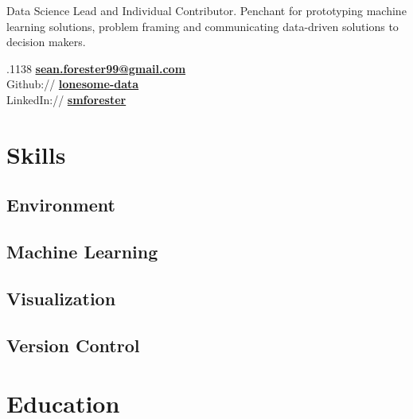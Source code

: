\documentclass[]{Forester-Resume}
\begin{document}
%
%
\lastupdated

%
%


{ 
Data Science Lead and Individual Contributor. Penchant for prototyping machine learning solutions, problem framing and communicating data-driven solutions to decision makers. %
}
%
%

\begin{minipage}[t]{0.33\textwidth} 
.1138
\href{mailto:sean.forester99@gmail.com}{\bf sean.forester99@gmail.com}\\
Github:// \href{https://github.com/lonesome-data}{\bf lonesome-data} \\
LinkedIn://  \href{https://www.linkedin.com/in/smforester/}{\bf {smforester}} \\

\section{Skills}
\subsection{Environment}
\subsection{Machine Learning}
\subsection{Visualization}
\subsection{Version Control}

\section{Education} 

\end{minipage}
\end{document}
